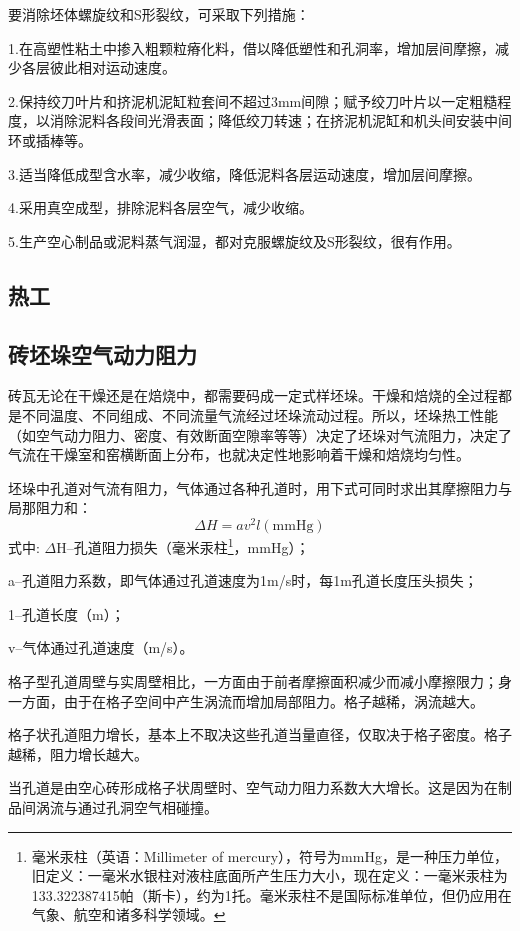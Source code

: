\documentclass{ctexbook}
\begin{document}
要消除坯体螺旋纹和S形裂纹，可采取下列措施：

1.在高塑性粘土中掺入粗颗粒瘠化料，借以降低塑性和孔洞率，增加层间摩擦，减少各层彼此相对运动速度。

2.保持绞刀叶片和挤泥机泥缸粒套间不超过3mm间隙；赋予绞刀叶片以一定粗糙程度，以消除泥料各段间光滑表面；降低绞刀转速；在挤泥机泥缸和机头间安装中间环或插棒等。

3.适当降低成型含水率，减少收缩，降低泥料各层运动速度，增加层间摩擦。

4.采用真空成型，排除泥料各层空气，减少收缩。

5.生产空心制品或泥料蒸气润湿，都对克服螺旋纹及S形裂纹，很有作用。
\subsection{热工}
\subsection{砖坯垛空气动力阻力}
砖瓦无论在干燥还是在焙烧中，都需要码成一定式样坯垛。干燥和焙烧的全过程都是不同温度、不同组成、不同流量气流经过坯垛流动过程。所以，坯垛热工性能（如空气动力阻力、密度、有效断面空隙率等等）决定了坯垛对气流阻力，决定了气流在干燥室和窑横断面上分布，也就决定性地影响着干燥和焙烧均匀性。

坯垛中孔道对气流有阻力，气体通过各种孔道时，用下式可同时求出其摩擦阻力与局那阻力和：
\begin{equation*}
	\Delta H =av^2l (\text{mmHg})
\end{equation*}
式中:
$\Delta$H--孔道阻力损失（毫米汞柱\footnote{毫米汞柱（英语：Millimeter of mercury），符号为mmHg，是一种压力单位，旧定义：一毫米水银柱对液柱底面所产生压力大小，现在定义：一毫米汞柱为133.322387415帕（斯卡），约为1托。毫米汞柱不是国际标准单位，但仍应用在气象、航空和诸多科学领域。}，mmHg）；

a--孔道阻力系数，即气体通过孔道速度为1m/s时，每1m孔道长度压头损失；

1--孔道长度（m）；

v--气体通过孔道速度（m/s）。

格子型孔道周壁与实周壁相比，一方面由于前者摩擦面积减少而减小摩擦限力；身一方面，由于在格子空间中产生涡流而增加局部阻力。格子越稀，涡流越大。

格子状孔道阻力增长，基本上不取决这些孔道当量直径，仅取决于格子密度。格子越稀，阻力增长越大。

当孔道是由空心砖形成格子状周壁时、空气动力阻力系数大大增长。这是因为在制品间涡流与通过孔洞空气相碰撞。
\end{document}
